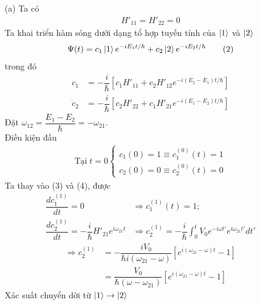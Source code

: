 \documentclass{article}
\newcommand{\f}[2]{\dfrac{#1}{#2}}
\begin{document}
\begin{enumerate}
	\item[(a)] Ta có
	      \begin{align*}
		      H'_{11} = H'_{22} = 0 \tag{1}
	      \end{align*}
	      Ta khai triển hàm sóng dưới dạng tổ hợp tuyến tính của $\ket{1}$ và $\ket{2}$
	      \begin{align*}
		      \Psi(t) = c_{1} \ket{1} e^{-iE_{1} t / \hbar} + c_{2} \ket{2} e^{-iE_{2} t / \hbar} \tag{2}
	      \end{align*}
	      trong đó
	      \begin{align*}
		      \dot{c}_{1} & = -\f{i}{\hbar} \left[ c_{1} H'_{11} + c_{2} H'_{12} e^{-i(E_2 - E_1) t / \hbar} \right] \tag{3} \\
		      \dot{c}_{2} & = -\f{i}{\hbar} \left[ c_{2} H'_{22} + c_{1} H'_{21} e^{-i(E_1 - E_2) t / \hbar} \right] \tag{4}
	      \end{align*}
	      Đặt $\omega_{12} = \f{E_{1} - E_{2}}{\hbar} = - \omega_{21}$.\\
	      Điều kiện đầu
	      \begin{align*}
		      \text{Tại} \; t = 0
		      \begin{cases}
			      c_{1}(0) = 1 \equiv c_{1}^{(0)}(t) = 1 \\
			      c_{2}(0) = 0 \equiv c_{2}^{(0)}(t) = 0
		      \end{cases} \tag{5}
	      \end{align*}
	      Ta thay vào (3) và (4), được
	      \begin{align*}
		      \f{d c_{1}^{(1)}}{dt} = 0                                       & \Rightarrow c_{1}^{(1)}(t) = 1;                                                                    \\
		      \f{d c_{2}^{(1)}}{dt} = -\f{i}{\hbar}H'_{21} e^{i\omega_{21} t} & \Rightarrow c_{2}^{(1)} = - \f{i}{\hbar} \int_{0}^{t} V_{0}e^{-i\omega t'} e^{i\omega_{21} t'} dt'
	      \end{align*}
	      \begin{align*}
		      \Rightarrow c_{2}^{(1)}
		       & = -\f{i V_{0}}{\hbar i (\omega_{21} - \omega)} \left[e^{i(\omega_{21} - \omega) t} - 1\right]    \\
		       & = \f{V_{0}}{\hbar (\omega - \omega_{21})} \left[e^{i(\omega_{21} - \omega) t} - 1\right] \tag{6}
	      \end{align*}
	      Xác suất chuyển dời từ $\ket{1} \rightarrow \ket{2}$
	      \begin{align*}

\end{align*}
\end{enumerate}
\end{document}
